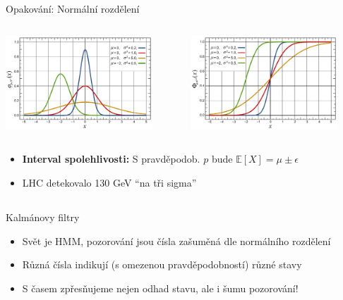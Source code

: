 \documentclass{beamer}
\begin{document}
\subsection{}
\begin{frame}{Opakování: Normální rozdělení}
\begin{columns}
	\begin{column}{5.5cm}
		\includegraphics[width=5.5cm]{Normal_Distribution_PDF.pdf}
	\end{column}
	\begin{column}{5.5cm}
		\includegraphics[width=5.5cm]{Normal_Distribution_CDF.pdf}
	\end{column}
\end{columns}

\begin{itemize}
\item {\bf Interval spolehlivosti:} S pravděpodob. $p$ bude $\mathbb{E}[X] = \mu \pm \epsilon$
\item LHC detekovalo 130 GeV ``na tři sigma''
\end{itemize}
\end{frame}

\subsection{}
\begin{frame}{Kalmánovy filtry}
\begin{itemize}
\item Svět je HMM, pozorování jsou čísla zašuměná dle normálního rozdělení
\item Různá čísla indikují (s omezenou pravděpodobností) různé stavy
\item S časem zpřesňujeme nejen odhad stavu, ale i šumu pozorování!
\end{itemize}
\end{frame}
\end{document}

